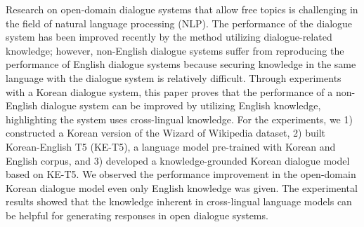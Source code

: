 Research on open-domain dialogue systems that allow free topics is challenging in the field of natural language processing (NLP). The performance of the dialogue system has been improved recently by the method utilizing dialogue-related knowledge; however, non-English dialogue systems suffer from reproducing the performance of English dialogue systems because securing knowledge in the same language with the dialogue system is relatively difficult. Through experiments with a Korean dialogue system, this paper proves that the performance of a non-English dialogue system can be improved by utilizing English knowledge, highlighting the system uses cross-lingual knowledge. For the experiments, we 1) constructed a Korean version of the Wizard of Wikipedia dataset, 2) built Korean-English T5 (KE-T5), a language model pre-trained with Korean and English corpus, and 3) developed a knowledge-grounded Korean dialogue model based on KE-T5. We observed the performance improvement in the open-domain Korean dialogue model even only English knowledge was given. The experimental results showed that the knowledge inherent in cross-lingual language models can be helpful for generating responses in open dialogue systems.
